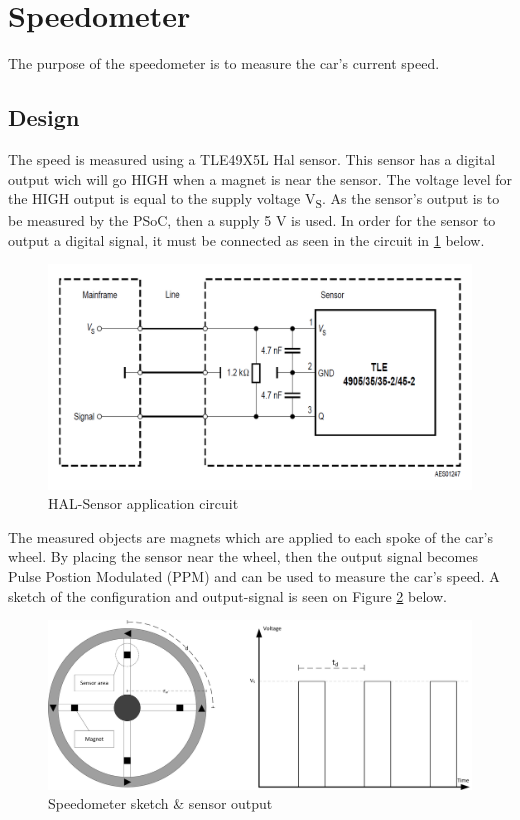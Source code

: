 \newpage
\section{Speedometer}
The purpose of the speedometer is to measure the car's current speed.

\subsection{Design}
The speed is measured using a TLE49X5L Hal sensor\cite{TLE4905}. This sensor has a digital output wich will go HIGH when a magnet is near the sensor. The voltage level for the HIGH output is equal to the supply voltage V\textsubscript{S}. As the sensor's output is to be measured by the PSoC, then a supply 5 V is used.
In order for the sensor to output a digital signal, it must be connected as seen in the circuit in \ref{fig:HAL_application} below.

\begin{figure}[H]
	\centering
	\includegraphics[width=0.6\linewidth]{Hardware/Pictures/HAL_Application}
	\caption{HAL-Sensor application circuit}
	\label{fig:HAL_application}
\end{figure}

The measured objects are magnets which are applied to each spoke of the car's wheel. By placing the sensor near the wheel, then the output signal becomes Pulse Postion Modulated (PPM) and can be used to measure the car's speed. A sketch of the configuration and output-signal is seen on Figure \ref{fig:Speed_sketch} below.

\begin{figure}[H]
	\centering
	\includegraphics[width=1\linewidth]{Hardware/Pictures/Speedometer_Sketch}
	\caption{Speedometer sketch \& sensor output}
	\label{fig:Speed_sketch}
\end{figure}

